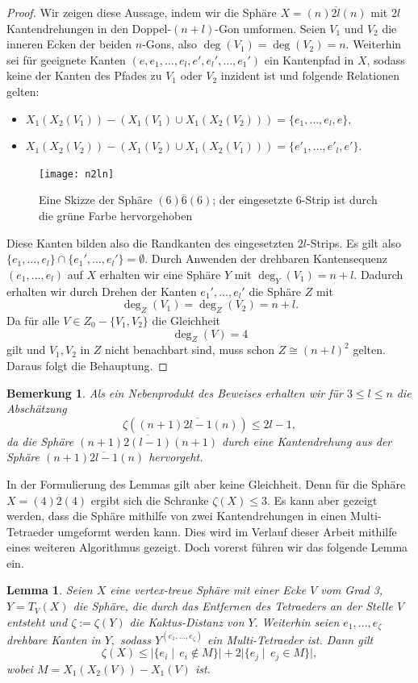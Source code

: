 \documentclass[12pt,titlepage,twoside,cleardoublepage]{article}
\theoremstyle{nummermitklammern}
\newtheorem{lemma}[temp]{Lemma}
\newtheorem{bemerkung}[temp]{Bemerkung}
\newtheorem{lemma}[zahl]{Lemma}
\newtheorem{bemerkung}[zahl]{Bemerkung}
\numberwithin{equation}{section}
\begin{document}
\begin{proof}
Wir zeigen diese Aussage, indem wir die Sphäre $X=(n)\overline{2l}(n)$ mit $2l$ Kantendrehungen in den Doppel-$(n+l)$-Gon umformen. Seien $V_1$ und $V_2$ die inneren Ecken der beiden $n$-Gons, also $\deg(V_1)=\deg(V_2)=n$. Weiterhin sei für geeignete Kanten $(e,e_1,\ldots,e_l,e',e_l',\ldots,e_1')$ ein Kantenpfad in $X$, sodass keine der Kanten des Pfades zu $V_1$ oder $V_2$ inzident ist und folgende Relationen gelten:
\begin{itemize}
\item $X_1(X_2(V_1))-(X_1(V_1)\cup X_1(X_2(V_2)))=\{e_1,\ldots,e_l,e\},$
\item $X_1(X_2(V_2))-(X_1(V_2)\cup X_1(X_2(V_1)))=\{e'_1,\ldots,e'_l,e'\}.$
\end{itemize}
\begin{figure}[H]
\begin{center}
\texttt{[image: n2ln]}
\end{center}
\caption{Eine Skizze der Sphäre $(6)\overline{6}(6)$; der eingesetzte 6-Strip ist durch die grüne Farbe hervorgehoben}
\end{figure}
Diese Kanten bilden also die Randkanten des eingesetzten $2l$-Strips.
Es gilt also $\{e_1,\ldots,e_l\}\cap\{e_1',\ldots,e_l'\}=\emptyset.$
Durch Anwenden der drehbaren Kantensequenz $(e_1,\ldots,e_l)$ auf $X$ erhalten wir eine Sphäre $Y$ mit $\deg_Y(V_1)=n+l.$ Dadurch erhalten wir durch Drehen der Kanten $e_1',\ldots,e_l'$ die Sphäre $Z$ mit 
\[
\deg_Z(V_1)=\deg_Z(V_2)=n+l.
\]
Da für alle $V\in Z_0-\{V_1,V_2\}$ die Gleichheit 
\[
\deg_Z(V)=4
\]
gilt und $V_1,V_2$ in $Z$ nicht benachbart sind, muss schon $Z\cong (n+l)^2$ gelten. Daraus folgt die Behauptung.
\end{proof}
\begin{bemerkung}
Als ein Nebenprodukt des Beweises erhalten wir für $3\leq l\leq n$ die Abschätzung 
\[
\zeta((n+1)\overline{2l-1}(n))\leq 2l-1,
\]
da die Sphäre $(n+1)\overline{2(l-1)}(n+1)$ durch eine Kantendrehung aus der Sphäre $(n+1)\overline{2l-1}(n)$ hervorgeht.
\end{bemerkung}
In der Formulierung des Lemmas gilt aber keine Gleichheit.
Denn für die Sphäre $X=(4)\overline{2}(4)$ ergibt sich die Schranke $\zeta(X)\leq 3.$ Es kann aber gezeigt werden, dass die Sphäre mithilfe von zwei Kantendrehungen in einen Multi-Tetraeder umgeformt werden kann. Dies wird im Verlauf dieser Arbeit mithilfe eines weiteren Algorithmus gezeigt. Doch vorerst führen wir das folgende Lemma ein.
\begin{lemma}
Seien $X$ eine vertex-treue Sphäre mit einer Ecke $V$ vom Grad 3,  $Y=T_V(X)$ die Sphäre, die durch das Entfernen des Tetraeders an der Stelle $V$ entsteht und $\zeta:=\zeta(Y)$ die Kaktus-Distanz von $Y.$ Weiterhin seien $e_1,\ldots,e_{\zeta}$ drehbare Kanten in $Y,$ sodass $Y^{(e_1,\ldots,e_{\zeta})}$ ein Multi-Tetraeder ist. Dann gilt
\[
\zeta(X)\leq \vert\{e_i\mid \, e_i \notin M\}\vert+2\vert \{e_j\mid \, e_j \in M\}\vert,
\]
wobei $M=X_1(X_2(V))-X_1(V)$ ist.
\end{lemma}
\end{document}
